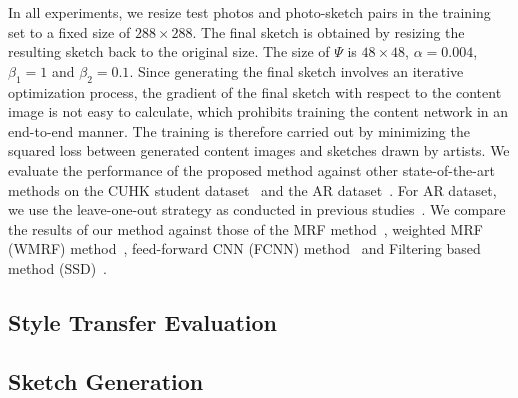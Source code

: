 \documentclass[10pt,twocolumn,letterpaper]{article}
\begin{document}
In all experiments, we resize test photos and photo-sketch pairs in the training set to a fixed size of $288\times288$. The final sketch is obtained by resizing the resulting sketch back to the original size. The size of $\Psi$ is $48\times48$, $\alpha=0.004$, $\beta_1=1$ and $\beta_2=0.1$. Since generating the final sketch involves an iterative optimization process, the gradient of the final sketch with respect to the content image is not easy to calculate, which prohibits training the content network in an end-to-end manner.  The training is therefore carried out by minimizing the squared loss between generated content images and sketches drawn by artists. We evaluate the performance of the proposed method against other state-of-the-art methods on the CUHK student dataset~\cite{wang2009face} and the AR dataset~\cite{martinez1998r}. For AR dataset, we use the leave-one-out strategy as conducted in previous studies~\cite{song2014real,wang2009face}. We compare the results of our method against those of the MRF method~\cite{wang2009face}, weighted MRF (WMRF) method~\cite{zhou2012markov}, feed-forward CNN (FCNN) method~\cite{zhang2015end} and Filtering based method (SSD)~\cite{song2014real}.

\subsection{Style Transfer Evaluation}

\subsection{Sketch Generation}
\end{document}
